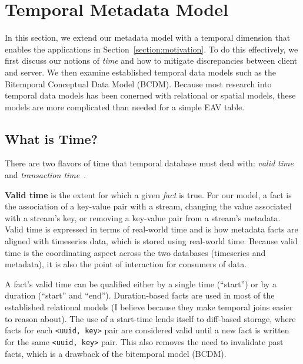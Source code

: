 \section{Temporal Metadata Model} \label{section:temporal}

In this section, we extend our metadata model with a temporal dimension that
enables the applications in Section~\ref{section:motivation}. To do this effectively, we first
discuss our notions of \emph{time} and how to mitigate discrepancies between client and server.
We then examine established temporal data models such as the Bitemporal Conceptual Data Model (BCDM).
Because most research into temporal data models has been conerned with relational or spatial models,
these models are more complicated than needed for a simple EAV table.


\subsection{What is Time?}

There are two flavors of time that temporal database must deal with:
\emph{valid time} and \emph{transaction time}~\cite{jensen1999temporal}\cite{jensen1996semantics}.

\textbf{Valid time} is the extent for which a given \emph{fact} is true. For
our model, a fact is the association of a key-value pair with a stream,
changing the value associated with a stream's key, or removing a key-value pair
from a stream's metadata. Valid time is expressed in terms of real-world time
and is how metadata facts are aligned with timeseries data, which is stored
using real-world time. Because valid time is the coordinating aspect across the
two databases (timeseries and metadata), it is also the point of interaction
for consumers of data.

A fact's valid time can be qualified either by a single time (``start'') or by
a duration (``start'' and ``end''). Duration-based facts are used in most of
the established relational models (I believe because they make temporal joins
easier to reason about).  The use of a start-time lends itself to diff-based
storage, where facts for each \texttt{<uuid, key>} pair are considered valid
until a new fact is written for the same \texttt{<uuid, key>} pair. This also
removes the need to invalidate past facts, which is a drawback of the
bitemporal model (BCDM).

